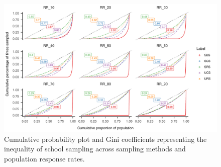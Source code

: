 \documentclass[english,man,floatsintext]{apa6}
\begin{document}
\begin{figure}
\includegraphics{6---Paper_files/figure-latex/fig-gini-curve-1} \caption{Cumulative probability plot and Gini coefficients representing the inequality of school sampling across sampling methods and population response rates.}\label{fig:fig-gini-curve}
\end{figure}
\end{document}
